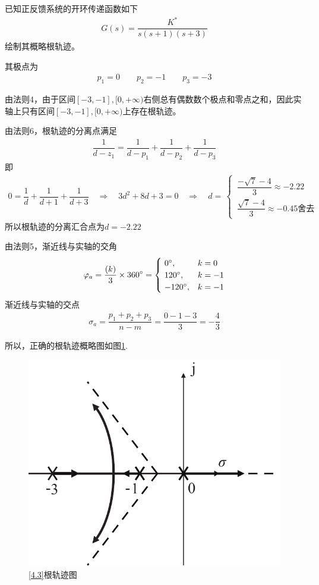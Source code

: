 \vspace*{-2.5em}

\examples \label{4.3}已知正反馈系统的开环传递函数如下
\begin{align}
	G(s) = \dfrac{K^*}{s(s+1)(s+3)}
\end{align}
绘制其概略根轨迹。

\solve 其极点为
\begin{align*}
	p_1 = 0 \quad \quad p_2 = -1 \quad \quad p_3 = -3
\end{align*}

由法则4，由于区间$[-3,-1],[0,+\infty)$右侧总有偶数数个极点和零点之和，因此实轴上只有区间$[-3,-1],[0,+\infty)$上存在根轨迹。

由法则6，根轨迹的分离点满足
\begin{align*}
	\dfrac{1}{d - z_1} = \dfrac{1}{d - p_1} + \dfrac{1}{d - p_2} + \dfrac{1}{d - p_3}
\end{align*}
即
\begin{align*}
	0 = \dfrac{1}{d} + \dfrac{1}{d + 1} + \dfrac{1}{d + 3} \quad \Rightarrow \quad 
	3d^2 + 8d + 3 = 0 \quad \Rightarrow \quad d = \,
	\begin{cases}
		\, \dfrac{- \sqrt{7} - 4 }{3} \approx -2.22 \\[0.5em]
		\, \dfrac{\sqrt{7} - 4}{3} \approx  -0.45 \mbox{舍去}
	\end{cases}
\end{align*}
所以根轨迹的分离汇合点为$d = -2.22 $

由法则5，渐近线与实轴的交角
\begin{align*}
	\varphi_a = \dfrac{(k)}{3} \times 360{}^{\circ} =
	\begin{cases}
		\,\, 0{}^{\circ}, &k = 0\\
		\,\, 120 {}^{\circ}, & k = -1\\
		\,\, -120 {}^{\circ}, & k = -1
	\end{cases} 
\end{align*}
渐近线与实轴的交点
\begin{align*}
	\sigma_a = \dfrac{p_1 + p_2 + p_3}{n - m} = \dfrac{0 -1 - 3 }{3} = -\dfrac{4}{3}
\end{align*}

所以，正确的根轨迹概略图如图\ref{F4.3}.


\begin{figure}[!htb]
	\centering
	\includegraphics[width=0.3\linewidth]{pic/4.3.pdf}
	\caption{\ref{4.3}根轨迹图}
	\label{F4.3}
\end{figure}

